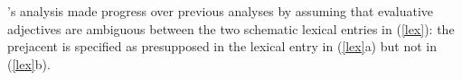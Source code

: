 \documentclass[11pt,fleqn]{article}
\newcommand{\6}{\mbox{$[\hspace*{-.6mm}[$}}
\newcommand{\9}{\mbox{$]\hspace*{-.6mm}]$}}
\newcommand{\citepos}[1]{\citeauthor{#1}'s \citeyear{#1}}
\begin{document}
%
%

\citepos{karttunen-etal2014} analysis made progress over previous analyses by assuming that evaluative adjectives are ambiguous between the two schematic lexical entries in (\ref{lex}): the prejacent is specified as presupposed in the lexical entry in  (\ref{lex}a) but not in (\ref{lex}b). 
\end{document}
